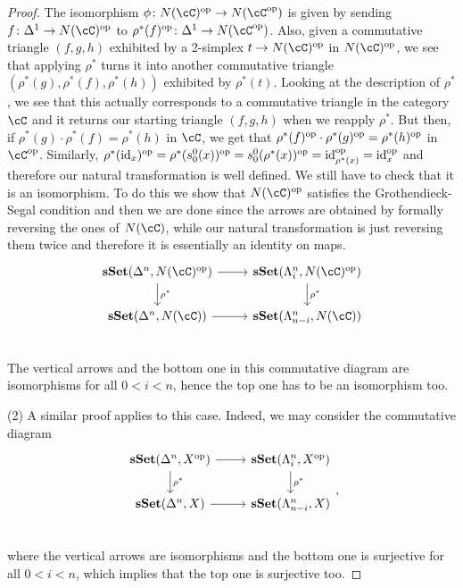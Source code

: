 \documentclass[a4paper,11pt,openany]{scrartcl}
\begin{document}
\begin{proof}
    The isomorphism $\phi\colon N(\cC)^{\op}\rightarrow N(\cC^{\op})$ is given
    by sending $f\colon\Delta^1\rightarrow N(\cC)^{\op}$ to
    $\rho^*(f)^{\op}\colon\Delta^1\rightarrow N(\cC^{\op})$. Also, given a
    commutative triangle $(f,g,h)$ exhibited by a 2-simplex $t\rightarrow
    N(\cC)^{\op}$ in $N(\cC)^{\op}$, we see that applying
    $\rho^*$ turns it into another commutative triangle
    $(\rho^*(g),\rho^*(f),\rho^*(h))$ exhibited by $\rho^*(t)$. Looking at the
    description of $\rho^*$, we see that this actually corresponds to a
    commutative triangle in the category $\cC$ and it returns our starting
    triangle $(f,g,h)$ when we reapply $\rho^*$. But then, if
    $\rho^*(g)\cdot\rho^*(f)=\rho^*(h)$ in $\cC$, we get that
    $\rho^*(f)^{\operatorname{op}}\cdot\rho^*(g)^{\operatorname{op}}=\rho^*(h)^{\operatorname{op}}$ in $\cC^{\op}$.
    Similarly,
    $\rho^*(\operatorname{id}_x)^{\operatorname{op}}=\rho^*(s^0_0(x))^{\operatorname{op}}=s^0_0(\rho^*(x))^{\operatorname{op}}=\operatorname{id}_{\rho^*(x)}^{\operatorname{op}}=\operatorname{id}_x^{\operatorname{op}}$
    and therefore our natural transformation is well defined.
    We still have to check that it is an isomorphism. To do this we show that
    $N(\cC)^{\op}$ satisfies the Grothendieck-Segal condition and then we are
    done since the arrows are obtained by formally reversing the ones of
    $N(\cC)$, while our natural transformation is just reversing them twice and
    therefore it is essentially an identity on maps.
    \[
        \begin{tikzcd}
            \sSet(\Delta^n,N(\cC)^{\op})\ar[r]\ar[d, "\rho^*"]
            & \sSet(\Lambda_i^n,N(\cC)^{\op})\ar[d, "\rho^*"] \\
            \sSet(\Delta^n,N(\cC))\ar[r]
            & \sSet(\Lambda_{n-i}^n,N(\cC)) \\
        \end{tikzcd}
    \]
    The vertical arrows and the bottom one in this commutative diagram are
    isomorphisms for all $0<i<n$, hence the top one has to be an isomorphism
    too.

    (2) A similar proof applies to this case. Indeed, we may consider the
    commutative diagram
    \[
        \begin{tikzcd}
            \sSet(\Delta^n,X^{\op})\ar[r]\ar[d, "\rho^*"]
            & \sSet(\Lambda_i^n,X^{\op})\ar[d, "\rho^*"] \\
            \sSet(\Delta^n,X)\ar[r]
            & \sSet(\Lambda_{n-i}^n,X) \\
        \end{tikzcd},
    \]
    where the vertical arrows are isomorphisms and the bottom one is surjective
    for all $0<i<n$, which implies that the top one is surjective too.
\end{proof}
\end{document}

